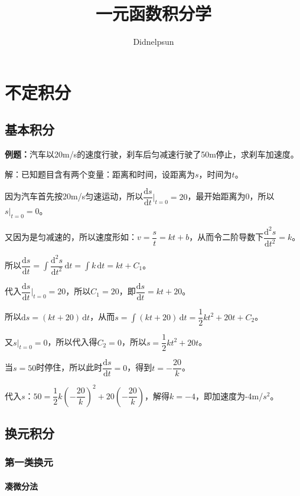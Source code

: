 \documentclass[UTF8, 12pt]{ctexart}
\author{Didnelpsun}
\title{一元函数积分学}
\date{}
\begin{document}
\maketitle
\pagestyle{empty}
\thispagestyle{empty}
\tableofcontents
\thispagestyle{empty}
\newpage
\pagestyle{plain}
\setcounter{page}{1}
\section{不定积分}
\subsection{基本积分}

\textbf{例题：}汽车以20m/s的速度行驶，刹车后匀减速行驶了50m停止，求刹车加速度。

解：已知题目含有两个变量：距离和时间，设距离为$s$，时间为$t$。

因为汽车首先按20m/s匀速运动，所以$\dfrac{\textrm{d}s}{\textrm{d}t}\bigg\vert_{t=0}=20$，最开始距离为0，所以$s\vert_{t=0}=0$。

又因为是匀减速的，所以速度形如：$v=\dfrac{s}{t}=kt+b$，从而令二阶导数下$\dfrac{\textrm{d}^2s}{\textrm{d}t^2}=k$。

所以$\displaystyle{\dfrac{\textrm{d}s}{\textrm{d}t}=\int\dfrac{\textrm{d}^2s}{\textrm{d}t^2}\,\textrm{d}t=\int k\,\textrm{d}t}=kt+C_1$。

代入$\dfrac{\textrm{d}s}{\textrm{d}t}\bigg\vert_{t=0}=20$，所以$C_1=20$，即$\dfrac{\textrm{d}s}{\textrm{d}t}=kt+20$。

所以$\textrm{d}s=(kt+20)\,\textrm{d}t$，从而$s=\displaystyle{\int(kt+20)\,\textrm{d}t}=\dfrac{1}{2}kt^2+20t+C_2$。

又$s\vert_{t=0}=0$，所以代入得$C_2=0$，所以$s=\dfrac{1}{2}kt^2+20t$。

当$s=50$时停住，所以此时$\dfrac{\textrm{d}s}{\textrm{d}t}=0$，得到$t=-\dfrac{20}{k}$。

代入$s$：$50=\dfrac{1}{2}k\left(-\dfrac{20}{k}\right)^2+20\left(-\dfrac{20}{k}\right)$，解得$k=-4$，即加速度为-4m/$s^2$。

\subsection{换元积分}

\subsubsection{第一类换元}

\paragraph{凑微分法} \leavevmode \medskip
\end{document}
